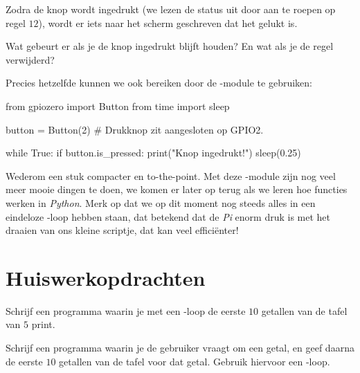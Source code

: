 
Zodra de knop wordt ingedrukt (we lezen de status uit door  aan te roepen op regel $12$), wordt er iets naar het scherm geschreven dat het gelukt is.

\begin{exercise}
Wat gebeurt er als je de knop ingedrukt blijft houden? En wat als je de  regel verwijderd?
\end{exercise}

Precies hetzelfde kunnen we ook bereiken door de -module te gebruiken:
\begin{python}
from gpiozero import Button
from time import sleep 

button = Button(2)  # Drukknop zit aangesloten op GPIO2.

while True: 
    if button.is_pressed: 
        print("Knop ingedrukt!") 
        sleep(0.25)
\end{python}

Wederom een stuk compacter en to-the-point. Met deze -module zijn nog veel meer mooie dingen te doen, we komen er later op terug als we leren hoe functies werken in \textit{Python}. Merk op dat we op dit moment nog steeds alles in een eindeloze -loop hebben staan, dat betekend dat de \textit{Pi} enorm druk is met het draaien van ons kleine scriptje, dat kan veel efficiënter!

\newpage

\section{Huiswerkopdrachten}
\vspace{5mm} 
\begin{exercise}
Schrijf een programma waarin je met een -loop de eerste $10$ getallen van de tafel van $5$ print.
\end{exercise}

\begin{exercise}
Schrijf een programma waarin je de gebruiker vraagt om een getal, en geef daarna de eerste $10$ getallen van de tafel voor dat getal. Gebruik hiervoor een -loop.
\end{exercise}

